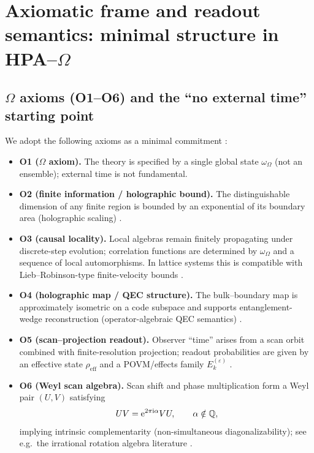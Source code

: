 \section{Axiomatic frame and readout semantics: minimal structure in HPA--\texorpdfstring{$\Omega$}{Omega}}
\label{sec:axioms_readout}

\subsection{\texorpdfstring{$\Omega$}{Omega} axioms (O1--O6) and the ``no external time'' starting point}
\label{subsec:axioms}

We adopt the following axioms as a minimal commitment \cite{Ma2025FoP,Ma2025HPOT}:
\begin{itemize}
  \item \textbf{O1 ($\Omega$ axiom).} The theory is specified by a single global state $\omega_{\Omega}$ (not an ensemble); external time is not fundamental.
  \item \textbf{O2 (finite information / holographic bound).} The distinguishable dimension of any finite region is bounded by an exponential of its boundary area (holographic scaling) \cite{tHooft1993,Susskind1995,Bousso2002}.
  \item \textbf{O3 (causal locality).} Local algebras remain finitely propagating under discrete-step evolution; correlation functions are determined by $\omega_{\Omega}$ and a sequence of local automorphisms. In lattice systems this is compatible with Lieb--Robinson-type finite-velocity bounds \cite{LiebRobinson1972}.
  \item \textbf{O4 (holographic map / QEC structure).} The bulk--boundary map is approximately isometric on a code subspace and supports entanglement-wedge reconstruction (operator-algebraic QEC semantics) \cite{AlmheiriDongHarlow2015,Pastawski2015,Harlow2017}.
  \item \textbf{O5 (scan--projection readout).} Observer ``time'' arises from a scan orbit combined with finite-resolution projection; readout probabilities are given by an effective state $\rho_{\mathrm{eff}}$ and a POVM/effects family $E_k^{(\varepsilon)}$ \cite{Kraus1983,NielsenChuang2000}.
  \item \textbf{O6 (Weyl scan algebra).} Scan shift and phase multiplication form a Weyl pair $(U,V)$ satisfying
  \begin{equation}
    UV = \mathrm{e}^{2\pi \mathrm{i} \alpha} VU ,
    \qquad \alpha\notin\mathbb{Q},
  \end{equation}
  implying intrinsic complementarity (non-simultaneous diagonalizability); see e.g.\ the irrational rotation algebra literature \cite{Rieffel1981}.
\end{itemize}

